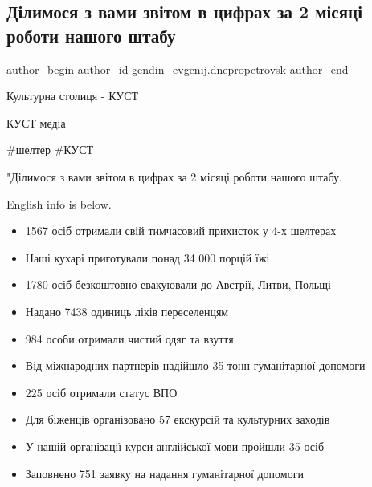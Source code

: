  
 
 
 
 
 
\subsection{Ділимося з вами звітом в цифрах за 2 місяці роботи нашого штабу}
\label{sec:02_05_2022.fb.gendin_evgenij.dnepropetrovsk.1.zvit}
 
\ifcmt
 author_begin
   author_id gendin_evgenij.dnepropetrovsk
 author_end
\fi

Культурна столиця - КУСТ 

КУСТ медіа 

\#шелтер \#КУСТ


"Ділимося з вами звітом в цифрах за 2 місяці роботи нашого штабу.

English info is below.

\begin{itemize}
  \item 1567 осіб отримали свій тимчасовий прихисток у 4-х шелтерах
  \item Наші кухарі приготували понад 34 000 порцій їжі
  \item 1780 осіб безкоштовно евакуювали до Австрії, Литви, Польщі
  \item Надано 7438 одиниць ліків переселенцям
  \item 984 особи отримали чистий одяг та взуття
  \item Від міжнародних партнерів надійшло 35 тонн гуманітарної допомоги
  \item 225 осіб отримали статус ВПО
\end{itemize}


\begin{itemize}
  \item Для біженців організовано 57 екскурсій та культурних заходів
  \item У нашій організації курси англійської мови пройшли 35 осіб
  \item Заповнено 751 заявку на надання гуманітарної допомоги
\end{itemize}

